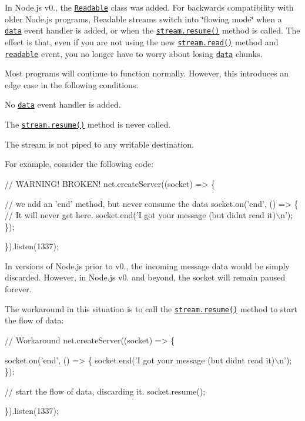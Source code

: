 In Node.\+js v0., the \href{#stream_class_stream_readable}{\tt Readable} class was added. For backwards compatibility with older Node.\+js programs, Readable streams switch into \char`\"{}flowing mode\char`\"{} when a \href{#stream_event_data}{\tt {\ttfamily \textquotesingle{}data\textquotesingle{}}} event handler is added, or when the \href{#stream_readable_resume}{\tt {\ttfamily stream.\+resume()}} method is called. The effect is that, even if you are not using the new \href{#stream_readable_read_size}{\tt {\ttfamily stream.\+read()}} method and \href{#stream_event_readable}{\tt {\ttfamily \textquotesingle{}readable\textquotesingle{}}} event, you no longer have to worry about losing \href{#stream_event_data}{\tt {\ttfamily \textquotesingle{}data\textquotesingle{}}} chunks.

Most programs will continue to function normally. However, this introduces an edge case in the following conditions\+:


\begin{DoxyItemize}
\item No \href{#stream_event_data}{\tt {\ttfamily \textquotesingle{}data\textquotesingle{}}} event handler is added.
\item The \href{#stream_readable_resume}{\tt {\ttfamily stream.\+resume()}} method is never called.
\item The stream is not piped to any writable destination.
\end{DoxyItemize}

For example, consider the following code\+:


\begin{DoxyCode}
// WARNING!  BROKEN!
net.createServer((socket) => \{

  // we add an 'end' method, but never consume the data
  socket.on('end', () => \{
    // It will never get here.
    socket.end('I got your message (but didnt read it)\(\backslash\)n');
  \});

\}).listen(1337);
\end{DoxyCode}


In versions of Node.\+js prior to v0., the incoming message data would be simply discarded. However, in Node.\+js v0. and beyond, the socket will remain paused forever.

The workaround in this situation is to call the \href{#stream_readable_resume}{\tt {\ttfamily stream.\+resume()}} method to start the flow of data\+:


\begin{DoxyCode}
// Workaround
net.createServer((socket) => \{

  socket.on('end', () => \{
    socket.end('I got your message (but didnt read it)\(\backslash\)n');
  \});

  // start the flow of data, discarding it.
  socket.resume();

\}).listen(1337);
\end{DoxyCode}


